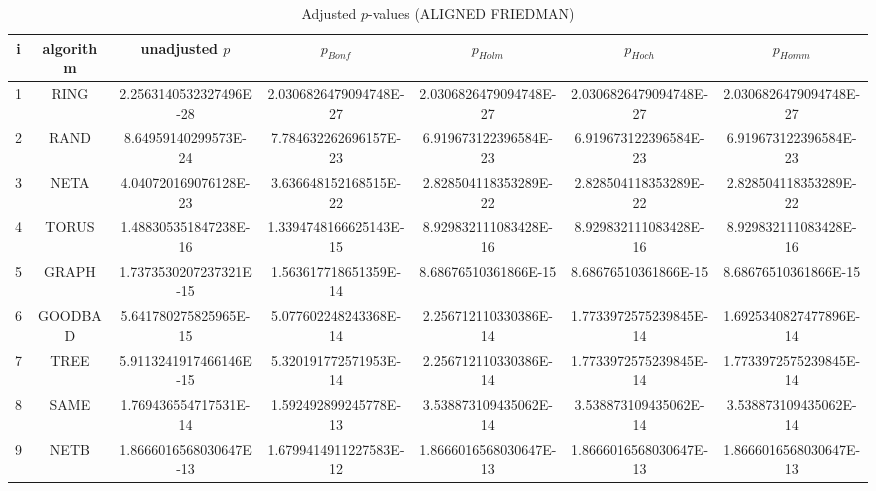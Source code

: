 \documentclass[a4paper,10pt]{article}
\begin{document}
\begin{landscape}
\begin{table}[!htp]
\centering\scriptsize
\caption{Adjusted $p$-values (ALIGNED FRIEDMAN)}
\begin{tabular}{ccccccc}
i&algorithm&unadjusted $p$&$p_{Bonf}$&$p_{Holm}$&$p_{Hoch}$&$p_{Homm}$\\
\hline
1& RING&2.2563140532327496E-28&2.0306826479094748E-27&2.0306826479094748E-27&2.0306826479094748E-27&2.0306826479094748E-27\\
2& RAND&8.64959140299573E-24&7.784632262696157E-23&6.919673122396584E-23&6.919673122396584E-23&6.919673122396584E-23\\
3& NETA&4.040720169076128E-23&3.636648152168515E-22&2.828504118353289E-22&2.828504118353289E-22&2.828504118353289E-22\\
4& TORUS&1.488305351847238E-16&1.3394748166625143E-15&8.929832111083428E-16&8.929832111083428E-16&8.929832111083428E-16\\
5& GRAPH&1.7373530207237321E-15&1.563617718651359E-14&8.68676510361866E-15&8.68676510361866E-15&8.68676510361866E-15\\
6& GOODBAD&5.641780275825965E-15&5.077602248243368E-14&2.256712110330386E-14&1.7733972575239845E-14&1.6925340827477896E-14\\
7& TREE&5.9113241917466146E-15&5.320191772571953E-14&2.256712110330386E-14&1.7733972575239845E-14&1.7733972575239845E-14\\
8& SAME&1.769436554717531E-14&1.592492899245778E-13&3.538873109435062E-14&3.538873109435062E-14&3.538873109435062E-14\\
9& NETB&1.8666016568030647E-13&1.6799414911227583E-12&1.8666016568030647E-13&1.8666016568030647E-13&1.8666016568030647E-13\\
\hline
\end{tabular}
\end{table}


\end{landscape}
\end{document}
